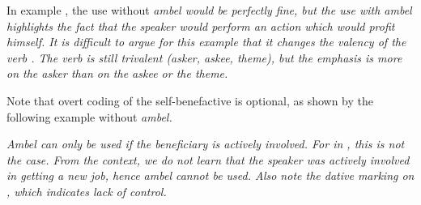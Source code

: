 
In example , the use without \em ambel \em would be perfectly fine, but the use with \em ambel \em highlights the fact that the speaker would perform an action which would profit himself. It is difficult to argue for this example that it changes the valency of the verb . The verb is still trivalent (asker, askee, theme), but the emphasis is more on the asker than on the askee or the theme.

Note that overt coding of the self-benefactive is optional, as shown by the following example without \em ambel\em.




%
%
%
%

\em Ambel \em can only be used if the beneficiary is actively involved. For  in , this is not the case. From the context, we do not learn that the speaker was actively involved in getting a new job, hence \em ambel \em cannot be used. Also note the dative marking on , which indicates lack of control.


